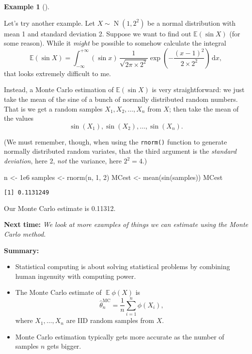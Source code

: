 \documentclass[
  letterpaper,
  DIV=11,
  numbers=noendperiod]{scrreprt}
\newenvironment{Shaded}{\begin{snugshade}}{\end{snugshade}}
\newcommand{\DecValTok}[1]{\textcolor[rgb]{0.68,0.00,0.00}{#1}}
\newcommand{\FloatTok}[1]{\textcolor[rgb]{0.68,0.00,0.00}{#1}}
\newcommand{\FunctionTok}[1]{\textcolor[rgb]{0.28,0.35,0.67}{#1}}
\newcommand{\NormalTok}[1]{\textcolor[rgb]{0.00,0.23,0.31}{#1}}
\newcommand{\OtherTok}[1]{\textcolor[rgb]{0.00,0.23,0.31}{#1}}
\newcommand{\Exg}{\operatorname{\mathbb{E}}}
\theoremstyle{plain}
\theoremstyle{definition}
\theoremstyle{definition}
\newtheorem{example}{Example}[chapter]
\theoremstyle{remark}
\begin{document}
\begin{example}[]\protect\hypertarget{exm-MC2}{}\label{exm-MC2}

Let's try another example. Let \(X \sim \operatorname{N}(1, 2^2)\) be a
normal distribution with mean 1 and standard deviation 2. Suppose we
want to find out \(\mathbb E(\sin X)\) (for some reason). While it
\emph{might} be possible to somehow calculate the integral
\[ \mathbb E(\sin X) = \int_{-\infty}^{+\infty} (\sin x) \, \frac{1}{\sqrt{2\pi\times 2^2}} \exp\left(-\frac{(x - 1)^2}{2\times 2^2}\right) \, \mathrm{d} x , \]
that looks extremely difficult to me.

Instead, a Monte Carlo estimation of \(\mathbb{E}(\sin X)\) is very
straightforward: we just take the mean of the sine of a bunch of
normally distributed random numbers. That is we get a random samples
\(X_1, X_2, \dots, X_n\) from \(X\); then take the mean of the values
\[\sin(X_1), \sin(X_2), \dots, \sin(X_n) .\]

(We must remember, though, when using the \texttt{rnorm()} function to
generate normally distributed random variates, that the third argument
is the \emph{standard deviation}, here \(2\), \emph{not} the variance,
here \(2^2 = 4\).)

\begin{Shaded}
\begin{Highlighting}[]
\NormalTok{n }\OtherTok{\textless{}{-}} \FloatTok{1e6}
\NormalTok{samples }\OtherTok{\textless{}{-}} \FunctionTok{rnorm}\NormalTok{(n, }\DecValTok{1}\NormalTok{, }\DecValTok{2}\NormalTok{)}
\NormalTok{MCest }\OtherTok{\textless{}{-}} \FunctionTok{mean}\NormalTok{(}\FunctionTok{sin}\NormalTok{(samples))}
\NormalTok{MCest}
\end{Highlighting}
\end{Shaded}

\begin{verbatim}
[1] 0.1131249
\end{verbatim}

Our Monte Carlo estimate is 0.11312.

\end{example}

\textbf{Next time:} \emph{We look at more examples of things we can
estimate using the Monte Carlo method.}

\textbf{Summary:}

\begin{itemize}
\item
  Statistical computing is about solving statistical problems by
  combining human ingenuity with computing power.
\item
  The Monte Carlo estimate of \(\Exg \phi(X)\) is
  \[ \widehat{\theta}_n^{\mathrm{MC}} = \frac{1}{n} \sum_{i=1}^n \phi(X_i) , \]
  where \(X_1, \dots, X_n\) are IID random samples from \(X\).
\item
  Monte Carlo estimation typically gets more accurate as the number of
  samples \(n\) gets bigger.
\end{itemize}
\end{document}
